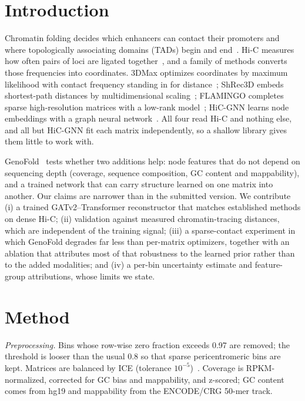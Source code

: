 \documentclass[conference]{IEEEtran}
\begin{document}
\section{Introduction}

Chromatin folding decides which enhancers can contact their promoters and
where topologically associating domains (TADs) begin and
end~\cite{lieberman2009,dixon2012}. Hi-C measures how often pairs of loci
are ligated together~\cite{rao2014}, and a family of methods converts
those frequencies into coordinates. 3DMax optimizes coordinates by
maximum likelihood with contact frequency standing in for
distance~\cite{oluwadare2018}; ShRec3D embeds shortest-path distances by
multidimensional scaling~\cite{lesne2014}; FLAMINGO completes sparse
high-resolution matrices with a low-rank model~\cite{flamingo2022};
HiC-GNN learns node embeddings with a graph neural
network~\cite{hicgnn2022}. All four read Hi-C and nothing else, and all
but HiC-GNN fit each matrix independently, so a shallow library gives
them little to work with.

GenoFold~\cite{genofold2025} tests whether two additions help: node
features that do not depend on sequencing depth (coverage, sequence
composition, GC content and mappability), and a trained network that can
carry structure learned on one matrix into another. Our claims are
narrower than in the submitted version. We contribute (i) a trained
GATv2--Transformer reconstructor that matches established methods on
dense Hi-C; (ii) validation against measured chromatin-tracing distances,
which are independent of the training signal; (iii) a sparse-contact
experiment in which GenoFold degrades far less than per-matrix
optimizers, together with an ablation that attributes most of that
robustness to the learned prior rather than to the added modalities; and
(iv) a per-bin uncertainty estimate and feature-group attributions,
whose limits we state.

\section{Method}

\textit{Preprocessing.} Bins whose row-wise zero fraction exceeds 0.97
are removed; the threshold is looser than the usual 0.8 so that sparse
pericentromeric bins are kept. Matrices are balanced by ICE
(tolerance $10^{-5}$)~\cite{imakaev2012}. Coverage is RPKM-normalized,
corrected for GC bias and mappability, and z-scored; GC content comes
from hg19 and mappability from the ENCODE/CRG 50-mer track.
\end{document}
